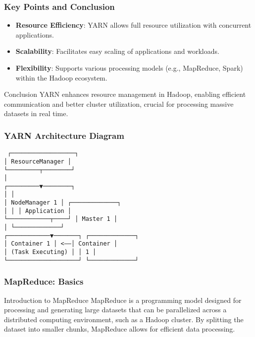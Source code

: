 \documentclass[aspectratio=169]{beamer}
\begin{document}
\begin{frame}[fragile]
    \frametitle{Key Points and Conclusion}
    \begin{itemize}
        \item \textbf{Resource Efficiency}: YARN allows full resource utilization with concurrent applications.
        \item \textbf{Scalability}: Facilitates easy scaling of applications and workloads.
        \item \textbf{Flexibility}: Supports various processing models (e.g., MapReduce, Spark) within the Hadoop ecosystem.
    \end{itemize}
    
    \begin{block}{Conclusion}
        YARN enhances resource management in Hadoop, enabling efficient communication and better cluster utilization, crucial for processing massive datasets in real time.
    \end{block}
\end{frame}

\begin{frame}[fragile]
    \frametitle{YARN Architecture Diagram}
    \begin{center}
        \texttt{
        ┌──────────────────┐\\
        │ ResourceManager  │\\
        └─────────┬────────┘\\
                  │\\
        ┌─────────▼────────┐\\
        │                 │\\
        │  NodeManager 1  │         ┌─────────────┐\\
        │                 │         │ Application  │\\
        └────────────┬────┘         │  Master 1   │\\
                     │               └─────────────┘\\
        ┌────────────▼───────┐       ┌─────────────┐\\
        │   Container 1      │ <-----│  Container  │\\
        │   (Task Executing) │       │     1       │\\   
        └────────────────────┘       └─────────────┘
        }
    \end{center}
\end{frame}

\begin{frame}[fragile]
    \frametitle{MapReduce: Basics}

    \begin{block}{Introduction to MapReduce}
        MapReduce is a programming model designed for processing and generating large datasets that can be parallelized across a distributed computing environment, such as a Hadoop cluster. By splitting the dataset into smaller chunks, MapReduce allows for efficient data processing.
    \end{block}
\end{frame}
\end{document}
